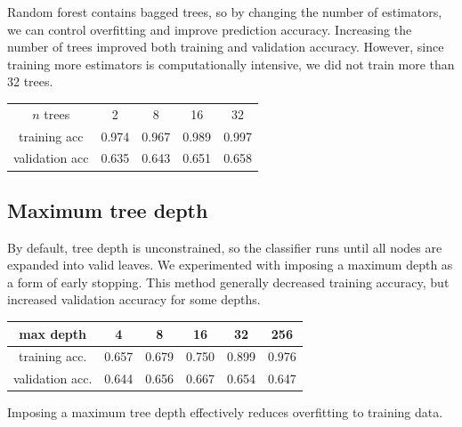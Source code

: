 \documentclass{article}
\begin{document}
\begin{multicols}{2}
Random forest contains bagged trees,
so by changing the number of estimators,
we can control overfitting and improve prediction accuracy.
Increasing the number of trees
improved both training and validation accuracy.
However, since training more estimators
is computationally intensive,
we did not train more than 32 trees.
%
%
%
\begin{center}
    \begin{tabular}{c|c c c c}
        $n$ trees
        		& 2 & 8 & 16 & 32 \\
        training acc
        		& 0.974 & 0.967 & 0.989 & 0.997\\
        validation acc
        		& 0.635 & 0.643 & 0.651 & 0.658
    \end{tabular}
\end{center}

\subsection{Maximum tree depth}

By default, tree depth is unconstrained,
so the classifier runs until all nodes
are expanded into valid leaves.
We experimented with imposing a maximum depth
as a form of early stopping.
This method generally decreased training accuracy,
but increased validation accuracy
for some depths.
%
%
%
%
%
\begin{center}
    \begin{tabular}{c|ccccc}
        max depth &
          4 & 8 & 16 & 32 & 256 \\\hline
        training acc. &
          0.657 & 0.679 & 0.750 & 0.899 & 0.976\\
        validation acc. &
          0.644 & 0.656 & 0.667 & 0.654 & 0.647
    \end{tabular}
\end{center}
Imposing a maximum tree depth effectively
reduces overfitting to training data.


\end{multicols}
\end{document}
